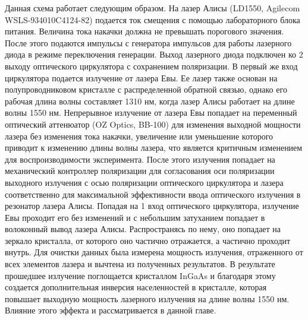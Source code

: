 Данная схема работает следующим образом. На лазер Алисы (LD1550, Agilecom WSLS-934010C4124-82) подается ток смещения с помощью лабораторного блока питания. Величина тока накачки должна не превышать порогового значения. После этого подаются импульсы с генератора импульсов для работы лазерного диода в режиме переключения генерации. Выход лазерного диода подключен ко 2 выходу оптического циркулятора с сохранением поляризации. В первый же вход циркулятора подается излучение от лазера Евы. Ее лазер также основан на полупроводниковом кристалле с распределенной обратной связью, однако его рабочая длина волны составляет 1310 нм, когда лазер Алисы работает на длине волны 1550 нм. Непрерывное излучение от лазера Евы попадает на переменный оптический аттенюатор (OZ Optics, BB-100) для изменения выходной мощности лазера без изменения тока накачки, увеличение или уменьшение которого приводит к изменению длины волны лазера, что является критичным изменением для воспроизводимости эксперимента. После этого излучения попадает на механический контроллер поляризации для согласования оси поляризации выходного излучения с осью поляризации оптического циркулятора и лазера соответственно для максимальной эффективности ввода оптического излучения в резонатор лазера Алисы. Попадая на 1 вход оптического циркулятора, излучение Евы проходит его без изменений и с небольшим затуханием попадает в волоконный вывод лазера Алисы. Распространясь по нему, оно попадает на зеркало кристалла, от которого оно частично отражается, а частично проходит внутрь. Для очистки данных была измерена мощность излучения, отраженного от всех элементов лазера и вычтена из полученных результатов. В результате прошедшее излучение поглощается кристаллом InGaAs и благодаря этому создается дополнительная инверсия населенностей в кристалле, которая повышает выходную мощность лазерного излучения на длине волны 1550 нм. Влияние этого эффекта и рассматривается в данной главе. 

